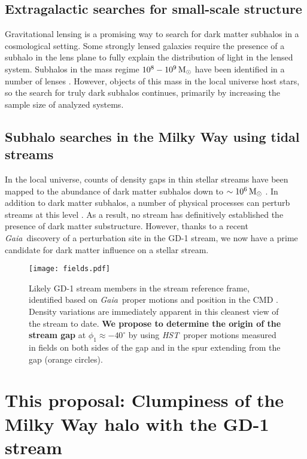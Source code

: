 \documentclass[12pt]{article}
\newcommand{\hst}{\textsl{HST}}
\newcommand{\gaia}{\textsl{Gaia}}
\begin{document}
\subsection*{Extragalactic searches for small-scale structure}
Gravitational lensing is a promising way to search for dark matter subhalos in a cosmological setting.
Some strongly lensed galaxies require the presence of a subhalo in the lens plane to fully explain the distribution of light in the lensed system.
Subhalos in the mass regime $10^8-10^9\,\rm M_\odot$ have been identified in a number of lenses \parencite[e.g.,][]{vegetti2012,hezaveh2016}.
However, objects of this mass in the local universe host stars, so the search for truly dark subhalos continues, primarily by increasing the sample size of analyzed systems.

\subsection*{Subhalo searches in the Milky Way using tidal streams}
In the local universe, counts of density gaps in thin stellar streams have been mapped to the abundance of dark matter subhalos down to $\sim10^6\,\rm M_\odot$ \parencite[e.g.,][]{carlberg2012,carlberg2013b}.
In addition to dark matter subhalos, a number of physical processes can perturb streams at this level \parencite[e.g.,][]{kupper2008, amorisco2016}.
As a result, no stream has definitively established the presence of dark matter substructure.
However, thanks to a recent \gaia\ discovery of a perturbation site in the GD-1 stream, we now have a prime candidate for dark matter influence on a stellar stream.

\begin{figure}
\begin{center}
\texttt{[image: fields.pdf]}
\end{center}
\caption{
Likely GD-1 stream members in the stream reference frame, identified based on \gaia\ proper motions and position in the CMD \parencite{pwb2018}.
Density variations are immediately apparent in this cleanest view of the stream to date.
{\bf We propose to determine the origin of the stream gap} at $\phi_1\approx-40^\circ$ by using \hst\ proper motions measured in fields on both sides of the gap and in the spur extending from the gap (orange circles).
}
\label{fig:fields}
\end{figure}

\section*{This proposal: Clumpiness of the Milky Way halo with the GD-1 stream}
\end{document}
